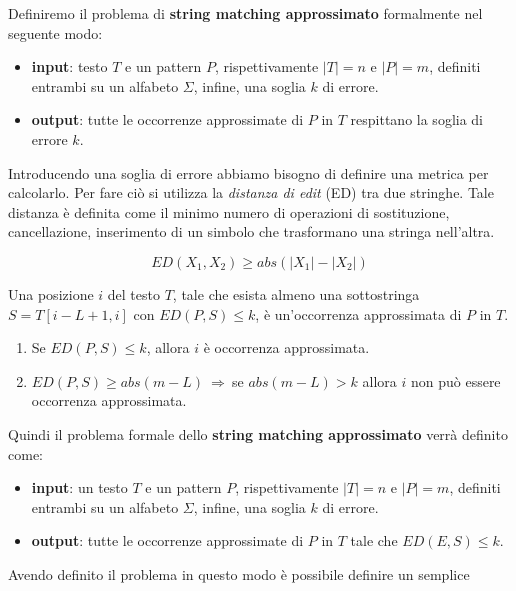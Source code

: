 Definiremo il problema di \textbf{string matching approssimato} formalmente nel seguente modo:
\begin{itemize}
    \item \textbf{input}: testo $T$ e un pattern $P$, rispettivamente $|T|=n$ e 
    $|P|=m$, definiti entrambi su un alfabeto $\Sigma$, infine, una soglia $k$ di errore. 
    \item \textbf{output}: tutte le occorrenze approssimate di $P$ in $T$ 
    respittano la soglia di errore $k$.
\end{itemize}
Introducendo una soglia di errore abbiamo bisogno di definire una metrica per 
calcolarlo. Per fare ciò si utilizza la \textit{distanza di edit} (ED) tra due 
stringhe. Tale distanza è definita come il minimo numero di operazioni di 
sostituzione, cancellazione, inserimento di un simbolo che trasformano una 
stringa nell'altra.
\begin{nota}
    \begin{equation}
        ED(X_1, X_2) \geq abs(|X_1| - |X_2|)
    \end{equation}
\end{nota}
\begin{definizione}
    Una posizione $i$ del testo $T$, tale che esista almeno una sottostringa 
    $S = T[i - L + 1,i]$ con $ED(P, S) \leq k$, è un'occorrenza approssimata di 
    $P$ in $T$.
\end{definizione}
\begin{nota}
    \begin{enumerate}
        \item Se $ED(P, S) \leq k$, allora $i$ è occorrenza approssimata.
        \item $ED(P, S) \geq abs(m - L) \ \Rightarrow \ $se $abs(m - L) > k$
              allora $i$ non può essere occorrenza approssimata.
    \end{enumerate}
\end{nota}
Quindi il problema formale dello \textbf{string matching approssimato} verrà definito come:
\begin{itemize}
	\item \textbf{input}: un testo $T$ e un pattern $P$, rispettivamente $|T|=n$
     e $|P|=m$, definiti entrambi su un alfabeto $\Sigma$, infine, una soglia $k$
      di errore. 
	\item \textbf{output}: tutte le occorrenze approssimate di $P$ in $T$ tale 
    che  $ED(E,S)\le k$.
\end{itemize}
Avendo definito il problema in questo modo è possibile definire un semplice 
